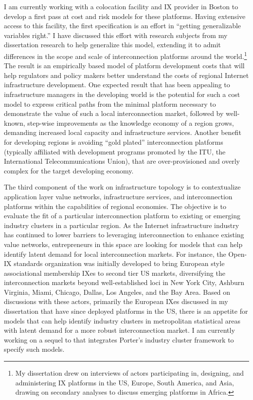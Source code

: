 \documentclass[12pt,journal,compsoc,letterpaper,onecolumn,twoside]{IEEEtran}
\begin{document}
I am currently working with a colocation facility and IX provider
in Boston to develop a first pass at cost and risk models for these
platforms.
%
Having extensive access to this facility, the first specification is
an effort in 
``getting generalizable variables right.''
%
I have discussed this effort with research subjects from my 
dissertation research to help generalize this model, extending it to
admit differences 
in the scope and scale of interconnection platforms around the
world.\footnote{My dissertation drew on interviews of actors
  participating in, designing, and administering IX platforms in the US,
  Europe, South America, and Asia, drawing on secondary analyses to
  discuss emerging platforms in Africa.}
%
The result is an empirically based model of platform development
costs that will help regulators and policy makers better understand
the costs of 
regional Internet infrastructure development.
%
One expected result that has been appealing to infrastructure
managers in the developing world is the potential for such a cost
model to express critical paths from the minimal platform necessary
to demonstrate the value of such a local interconnection market,
followed by well-known, 
step-wise improvements as the knowledge economy of a region grows,
demanding increased local capacity and infrastructure services.
%
Another benefit for developing regions is avoiding ``gold
plated'' interconnection platforms (typically affiliated with
development programs promoted by the ITU, the International
Telecommunications Union), that are over-provisioned and overly
complex for the target developing economy.


The third component of the work on infrastructure topology is to
contextualize application layer  value networks, infrastructure
services, and interconnection platforms within the capabilities of 
regional economies.
%
The objective is to evaluate the fit of a particular interconnection
platform to existing or emerging industry clusters in a particular
region.
%
As the Internet infrastructure industry has continued to lower
barriers to leveraging interconnection to enhance existing value
networks, entrepreneurs in this space are looking for models that can
help identify latent demand for local interconnection markets.
%
For instance, the Open-IX standards organization was initially
developed to bring European style associational membership IXes to
second tier US markets, diversifying the interconnection markets
beyond well-established loci in New York City, Ashburn Virginia,
Miami, Chicago, Dallas, Los Angeles, and the Bay Area.
%
Based on discussions with these actors, primarily the European IXes
discussed in my dissertation that have since deployed platforms
in the US, there is an appetite for models that can help identify
industry clusters in metropolitan statistical areas with latent demand
for a more robust interconnection market.
%
I am currently working on a sequel to  that
integrates Porter's industry cluster framework to specify such models. 
\end{document}
